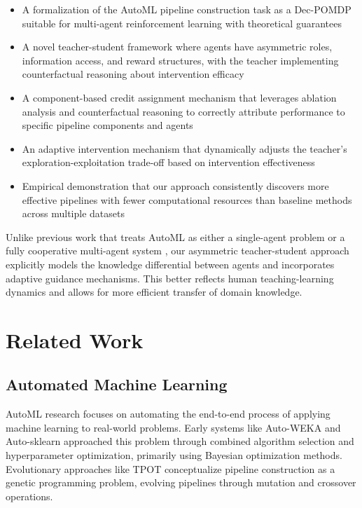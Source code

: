 \documentclass[twoside,11pt]{article}
\begin{document}
\begin{itemize}
    \item A formalization of the AutoML pipeline construction task as a Dec-POMDP suitable for multi-agent reinforcement learning with theoretical guarantees
    
    \item A novel teacher-student framework where agents have asymmetric roles, information access, and reward structures, with the teacher implementing counterfactual reasoning about intervention efficacy
    
    \item A component-based credit assignment mechanism that leverages ablation analysis and counterfactual reasoning to correctly attribute performance to specific pipeline components and agents
    
    \item An adaptive intervention mechanism that dynamically adjusts the teacher's exploration-exploitation trade-off based on intervention effectiveness
    
    \item Empirical demonstration that our approach consistently discovers more effective pipelines with fewer computational resources than baseline methods across multiple datasets
\end{itemize}

Unlike previous work that treats AutoML as either a single-agent problem \citep{zoph2017neural} or a fully cooperative multi-agent system \citep{wang2022multi}, our asymmetric teacher-student approach explicitly models the knowledge differential between agents and incorporates adaptive guidance mechanisms. This better reflects human teaching-learning dynamics and allows for more efficient transfer of domain knowledge.

\section{Related Work}

\subsection{Automated Machine Learning}

AutoML research focuses on automating the end-to-end process of applying machine learning to real-world problems. Early systems like Auto-WEKA \citep{thornton2013} and Auto-sklearn \citep{feurer2019auto} approached this problem through combined algorithm selection and hyperparameter optimization, primarily using Bayesian optimization methods. Evolutionary approaches like TPOT \citep{olson2016} conceptualize pipeline construction as a genetic programming problem, evolving pipelines through mutation and crossover operations.
\end{document}

